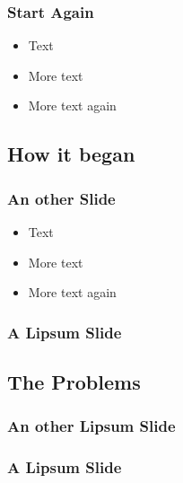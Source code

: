 \begin{frame} 
\frametitle{Start Again}
  \begin{itemize}
  \item Text
  \item More text
  \item More text again
  \end{itemize}
\end{frame}

\subsection{How it began}

\begin{frame} 
\frametitle{An other Slide}
  \begin{itemize}
  \item Text
  \item More text
  \item More text again
  \end{itemize}
\end{frame}


\begin{frame}
\frametitle{A Lipsum Slide}
  \lipsum[2]
\end{frame}

\subsection{The Problems}

\begin{frame}
\frametitle{An other Lipsum Slide}
  \lipsum[2]
\end{frame}


\begin{frame}
\frametitle{A Lipsum Slide}
  \lipsum[5]
\end{frame}


